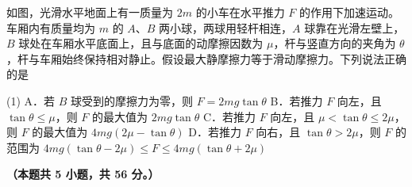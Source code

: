 \begin{question}
如图，光滑水平地面上有一质量为 $2m$ 的小车在水平推力 $F$ 的作用下加速运动。车厢内有质量均为 $m$ 的 $A$、$B$ 两小球，两球用轻杆相连，$A$ 球靠在光滑左壁上，$B$ 球处在车厢水平底面上，且与底面的动摩擦因数为 $\mu$，杆与竖直方向的夹角为 $\theta$，杆与车厢始终保持相对静止。假设最大静摩擦力等于滑动摩擦力。下列说法正确的是\gkblank


\begin{gkopts}(1)
  \task A．若 $B$ 球受到的摩擦力为零，则 $F=2mg\tan\theta$
  \task B．若推力 $F$ 向左，且 $\tan\theta\le\mu$，则 $F$ 的最大值为 $2mg\tan\theta$
  \task C．若推力 $F$ 向左，且 $\mu<\tan\theta\le2\mu$，则 $F$ 的最大值为 $4mg(2\mu-\tan\theta)$
  \task D．若推力 $F$ 向右，且 $\tan\theta>2\mu$，则 $F$ 的范围为 $4mg(\tan\theta-2\mu)\le F\le4mg(\tan\theta+2\mu)$
\end{gkopts}
\end{question}


\noindent\textbf{（本题共 5 小题，共 56 分。）}

